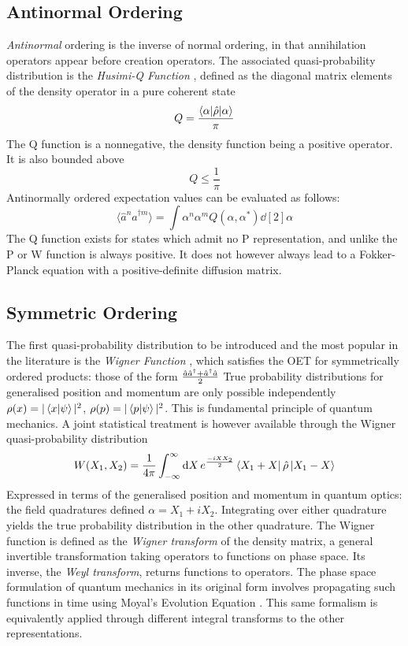 \subsection{Antinormal Ordering}
\emph{Antinormal} ordering is the inverse of normal ordering, in that annihilation operators appear before creation operators.
The associated quasi-probability distribution is the \emph{Husimi-Q Function} \cite{Husimi1940}, defined as the diagonal matrix elements of the density operator in a pure coherent state
\begin{equation}
	Q = \frac{\langle \alpha | \hat{\rho} | \alpha \rangle}{\pi}
	\label{qdef}
\end{equation}
The Q function is a nonnegative, the density function being a positive operator.
It is also bounded above
\begin{equation}
	Q \leq \frac{1}{\pi}
\end{equation}
Antinormally ordered expectation values can be evaluated as follows:
\begin{equation}
  \langle \hat{a}^n \hat{a}^{\dagger m}  \rangle = \int \alpha^n \alpha^m Q (\alpha, \alpha^*) \dd[2]{\alpha}
\end{equation}
The Q function exists for states which admit no P representation, and unlike the P or W function is always positive.
It does not however always lead to a Fokker-Planck equation with a positive-definite diffusion matrix. 
\subsection{Symmetric Ordering}
The first quasi-probability distribution to be introduced and the most popular in the literature is the \emph{Wigner Function} \cite{Wigner1932} , which satisfies the OET for symmetrically ordered products: those of the form $\frac{\hat{a} {\hat{a}^\dagger} + {\hat{a}^\dagger} \hat{a}}{2}$
True probability distributions for generalised position and momentum are only possible independently $\rho(x) = |\braket{x}{\psi}|^2$, $\rho(p) = |\braket{p}{\psi}|^2$.
This is fundamental principle of quantum mechanics.
A joint statistical treatment is however available through the Wigner quasi-probability distribution
\begin{equation}
  W(X_1, X_2) = \frac{1}{4 \pi} \int_{-\infty}^\infty \dd{X} e^{\frac{-iXX_2}{2}} \bra{X_1+X} \hat{\rho} \ket{X_1-X}
\end{equation}
Expressed in terms of the generalised position and momentum in quantum optics: the field quadratures defined $\alpha = X_1 + iX_2$.
Integrating over either quadrature yields the true probability distribution in the other quadrature.
The Wigner function is defined as the \emph{Wigner transform} of the density matrix, a general invertible transformation taking operators to functions on phase space.
Its inverse, the \emph{Weyl transform}, returns functions to operators.
The phase space formulation of quantum mechanics in its original form involves propagating such functions in time using Moyal's Evolution Equation \cite{Curtright2011}.
This same formalism is equivalently applied  through different integral transforms to the other representations.
